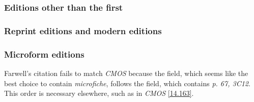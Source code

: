\documentclass[11pt,letterpaper,oneside]{article}
\begin{document}
\begin{citebib}
\item \cite[133--34]{adams1867}
\item \cite{jackson1676}
\end{citebib}

\setcounter{subsubsection}{112}
\subsubsection{Editions other than the first}

\begin{citebib}
\item \cite[401--2]{einsohn2011}
\item \cite[101]{boudett2013}
\item \cite{strunk2000}
\end{citebib}

\subsubsection{Reprint editions and modern editions}
\label{14.114}


\begin{citebib}
\item \cite[152--53]{barzun1994}
\item \cite{bahadur2014}
\item \cite{schweitzer1966}
\end{citebib}

\subsubsection{Microform editions}

Farwell's citation fails to match \textit{CMOS} because the
 field, which seems like the best choice to
contain \textit{microfiche}, follows the  field,
which contains \textit{p. 67, 3C12}. This order is necessary
elsewhere, such as in \textit{CMOS} \ref{14.163}.
\end{document}
